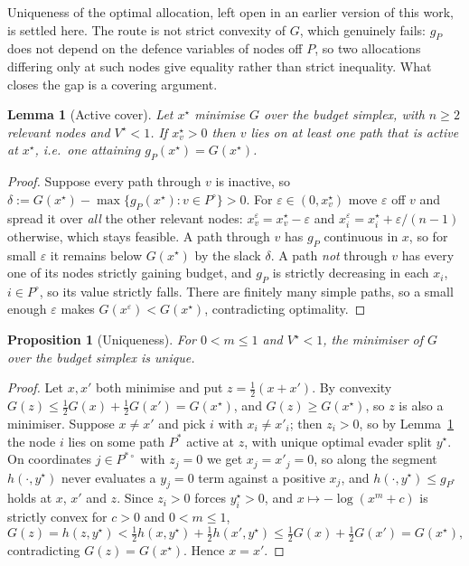 \documentclass[11pt,a4paper]{article}
\theoremstyle{plain}
\newtheorem{proposition}[theorem]{Proposition}
\newtheorem{lemma}[theorem]{Lemma}
\theoremstyle{definition}
\begin{document}
Uniqueness of the optimal allocation, left open in an earlier version of
this work, is settled here. The route is not strict convexity of $G$,
which genuinely fails: $g_P$ does not depend on the defence variables of
nodes off $P$, so two allocations differing only at such nodes give
equality rather than strict inequality. What closes the gap is a covering
argument.

\begin{lemma}[Active cover]
\label{lem:active-cover}
Let $x^{\star}$ minimise $G$ over the budget simplex, with $n\ge2$
relevant nodes and $V^{\star}<1$. If $x^{\star}_v>0$ then $v$ lies on at
least one path that is active at $x^{\star}$, i.e.\ one attaining
$g_P(x^{\star})=G(x^{\star})$.
\end{lemma}

\begin{proof}
Suppose every path through $v$ is inactive, so
$\delta:=G(x^{\star})-\max\{g_P(x^{\star}):v\in P^{\circ}\}>0$. For
$\varepsilon\in(0,x^{\star}_v)$ move $\varepsilon$ off $v$ and spread it
over \emph{all} the other relevant nodes:
$x^{\varepsilon}_v=x^{\star}_v-\varepsilon$ and
$x^{\varepsilon}_i=x^{\star}_i+\varepsilon/(n-1)$ otherwise, which stays
feasible. A path through $v$ has $g_P$ continuous in $x$, so for small
$\varepsilon$ it remains below $G(x^{\star})$ by the slack $\delta$. A
path \emph{not} through $v$ has every one of its nodes strictly gaining
budget, and $g_P$ is strictly decreasing in each $x_i$, $i\in P^{\circ}$,
so its value strictly falls. There are finitely many simple paths, so a
small enough $\varepsilon$ makes $G(x^{\varepsilon})<G(x^{\star})$,
contradicting optimality.
\end{proof}

\begin{proposition}[Uniqueness]
\label{prop:uniqueness}
For $0<m\le1$ and $V^{\star}<1$, the minimiser of $G$ over the budget
simplex is unique.
\end{proposition}

\begin{proof}
Let $x,x'$ both minimise and put $z=\tfrac12(x+x')$. By convexity
$G(z)\le\tfrac12G(x)+\tfrac12G(x')=G(x^{\star})$, and $G(z)\ge
G(x^{\star})$, so $z$ is also a minimiser. Suppose $x\ne x'$ and pick $i$
with $x_i\ne x'_i$; then $z_i>0$, so by Lemma~\ref{lem:active-cover} the
node $i$ lies on some path $P^{*}$ active at $z$, with unique optimal
evader split $y^{\star}$. On coordinates $j\in P^{*\circ}$ with $z_j=0$
we get $x_j=x'_j=0$, so along the segment $h(\cdot,y^{\star})$ never
evaluates a $y_j=0$ term against a positive $x_j$, and
$h(\cdot,y^{\star})\le g_{P^{*}}$ holds at $x$, $x'$ and $z$. Since
$z_i>0$ forces $y^{\star}_i>0$, and
$x\mapsto-\log(x^m+c)$ is strictly convex for $c>0$ and $0<m\le1$,
\[
G(z)=h(z,y^{\star})<\tfrac12h(x,y^{\star})+\tfrac12h(x',y^{\star})
\le\tfrac12G(x)+\tfrac12G(x')=G(x^{\star}),
\]
contradicting $G(z)=G(x^{\star})$. Hence $x=x'$.
\end{proof}
\end{document}

